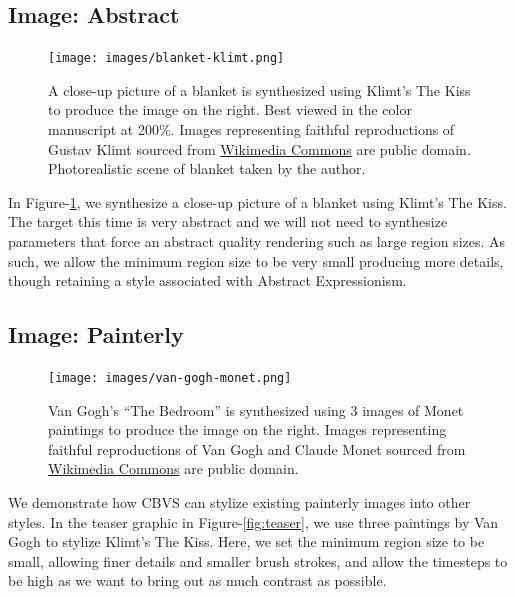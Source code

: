 \documentclass[a4paper,10pt,final]{ThesisStyle}
\begin{document}
\subsection{Image: Abstract}\vspace{-0.4em}
\begin{figure}[ht]
  \centering
  \texttt{[image: images/blanket-klimt.png]}
  \caption{A close-up picture of a blanket is synthesized using Klimt's The Kiss to produce the image on the right. Best viewed in the color manuscript at 200\%. Images representing faithful reproductions of Gustav Klimt sourced from \href{http://commons.wikimedia.org}{Wikimedia Commons} are public domain.  Photorealistic scene of blanket taken by the author.}
  \label{fig:blanket-klimt}
\end{figure}
In Figure-\ref{fig:blanket-klimt}, we synthesize a close-up picture of a blanket using Klimt's The Kiss.  The target this time is very abstract and we will not need to synthesize parameters that force an abstract quality rendering such as large region sizes.  As such, we allow the minimum region size to be very small producing more details, though retaining a style associated with Abstract Expressionism.
\subsection{Image: Painterly}\vspace{-0.4em}
\begin{figure}[ht]
  \centering
  \texttt{[image: images/van-gogh-monet.png]}
  \caption{Van Gogh's ``The Bedroom'' is synthesized using 3 images of Monet paintings to produce the image on the right. Images representing faithful reproductions of Van Gogh and Claude Monet sourced from \href{http://commons.wikimedia.org}{Wikimedia Commons} are public domain.}
  \label{fig:van-gogh-monet}
\end{figure}
We demonstrate how CBVS can stylize existing painterly images into other styles.  In the teaser graphic in Figure-\ref{fig:teaser}, we use three paintings by Van Gogh to stylize Klimt's The Kiss.  Here, we set the minimum region size to be small, allowing finer details and smaller brush strokes, and allow the timesteps to be high as we want to bring out as much contrast as possible.  
\end{document}
